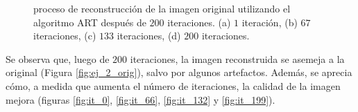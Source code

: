 \documentclass[11pt, twocolumn]{article}
\begin{document}
\begin{figure}[htbp]
  \centering
  \hfill
  \hfill
  \hfill
  \hfill
  \caption{proceso de reconstrucción de la imagen original utilizando el algoritmo ART después de $200$ iteraciones. (a) $1$ iteración, (b) $67$ iteraciones, (c) $133$ iteraciones, (d) $200$ iteraciones.}
  \label{fig:ej_2_it_200}
\end{figure}

Se observa que, luego de $200$ iteraciones, la imagen reconstruida se asemeja a la original (Figura \ref{fig:ej_2_orig}), salvo por algunos artefactos. Además, se aprecia cómo, a medida que aumenta el número de iteraciones, la calidad de la imagen mejora (figuras \ref{fig:it_0}, \ref{fig:it_66}, \ref{fig:it_132} y \ref{fig:it_199}).
\end{document}
